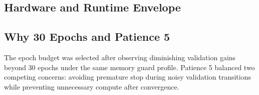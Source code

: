 \documentclass[10pt,twocolumn]{article}
\begin{document}
\subsection{Hardware and Runtime Envelope}
\begin{table}[H]
\centering
\caption{Runtime profile used across all reported seeds.}
\label{tab:runtime_profile}
\end{table}

\subsection{Why 30 Epochs and Patience 5}
The epoch budget was selected after observing diminishing validation gains beyond 30 epochs under the same memory guard profile. Patience 5 balanced two competing concerns: avoiding premature stop during noisy validation transitions while preventing unnecessary compute after convergence.
\end{document}
